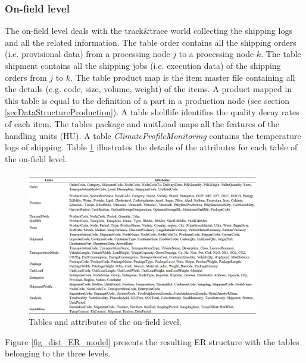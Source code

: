 \subsubsection{On-field level}

The on-field level deals with the track\&trace world collecting the shipping logs and all the related information. The table order contains all the shipping orders (i.e. provisional data) from a processing node $j$ to a processing node $k$. The table shipment contains all the shipping jobs (i.e. execution data) of the shipping orders from $j$ to $k$. The table product map is the item master file containing all the details (e.g. code, size, volume, weight) of the items. A product mapped in this table is equal to the definition of a part in a production node (see section \ref{secDataStructureProduction}). A table shelflife identifies the quality decay rates of each item. The tables package and unitLoad maps all the features of the handling units (HU). A table \textit{ClimateProfileMonitoring} contains the temperature logs of shipping. Table \ref{tab_onfield_attributes} illustrates the details of the attributes for each table of the on-field level.

\begin{figure}[hbt!]
\centering
\includegraphics[width=0.9\textwidth]{SectionDistribution/diagnosticModels_figures/tab_onfield_attributes.png}
\captionsetup{type=table}
\caption{Tables and attributes of the on-field level.}
\label{tab_onfield_attributes}
\end{figure}

Figure \ref{fig_dist_ER_model} presents the resulting ER structure with the tables belonging to the three levels.

